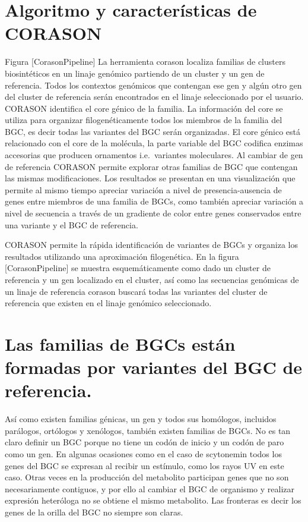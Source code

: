 \documentclass[12pt,twoside]{reedthesis}
\begin{document}
  \section{Algoritmo y características de
  CORASON}\label{algoritmo-y-caracteristicas-de-corason}
  
  Figura {[}CorasonPipeline{]} La herramienta corason localiza familias de
  clusters biosintéticos en un linaje genómico partiendo de un cluster y
  un gen de referencia. Todos los contextos genómicos que contengan ese
  gen y algún otro gen del cluster de referencia serán encontrados en el
  linaje seleccionado por el usuario. CORASON identifica el core génico de
  la familia. La información del core se utiliza para organizar
  filogenéticamente todos los miembros de la familia del BGC, es decir
  todas las variantes del BGC serán organizadas. El core génico está
  relacionado con el core de la molécula, la parte variable del BGC
  codifica enzimas accesorias que producen ornamentos i.e.~variantes
  moleculares. Al cambiar de gen de referencia CORASON permite explorar
  otras familias de BGC que contengan las mismas modificaciones. Los
  resultados se presentan en una visualización que permite al mismo tiempo
  apreciar variación a nivel de presencia-ausencia de genes entre miembros
  de una familia de BGCs, como también apreciar variación a nivel de
  secuencia a través de un gradiente de color entre genes conservados
  entre una variante y el BGC de referencia.
  
  CORASON permite la rápida identificación de variantes de BGCs y organiza
  los resultados utilizando una aproximación filogenética. En la figura
  {[}CorasonPipeline{]} se muestra esquemáticamente como dado un cluster
  de referencia y un gen localizado en el cluster, así como las secuencias
  genómicas de un linaje de referencia corason buscará todas las variantes
  del cluster de referencia que existen en el linaje genómico
  seleccionado.
  
  \section{Las familias de BGCs están formadas por variantes del BGC de
  referencia.}\label{las-familias-de-bgcs-estan-formadas-por-variantes-del-bgc-de-referencia.}
  
  Así como existen familias génicas, un gen y todos sus homólogos,
  incluidos parálogos, ortólogos y xenólogos, también existen familias de
  BGCs. No es tan claro definir un BGC porque no tiene un codón de inicio
  y un codón de paro como un gen. En algunas ocasiones como en el caso de
  scytonemin todos los genes del BGC se expresan al recibir un estímulo,
  como los rayos UV en este caso. Otras veces en la producción del
  metabolito participan genes que no son necesariamente contiguos, y por
  ello al cambiar el BGC de organismo y realizar expresión heteróloga no
  se obtiene el mismo metabolito. Las fronteras es decir los genes de la
  orilla del BGC no siempre son claras.
  
\end{document}
